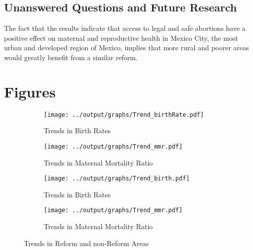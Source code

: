 \documentclass[a4paper, 11pt]{article}
\begin{document}
\begin{spacing}{1.5}
\begin{multicols}{2}
\subsection{Unanswered Questions and Future Research}      	    
The fact that the results indicate that access to legal and safe abortions have a positive effect on maternal and reproductive health in Mexico City, the most urban and developed region of Mexico, implies that more rural and poorer areas would greatly benefit from a similar reform.   
 \newpage
 
 
\end{multicols} 	
\section*{Figures}
\begin{figure}[htpb!]
	\centering
	\begin{subfigure}{.5\textwidth}
		\centering
		\texttt{[image: ../output/graphs/Trend\_birthRate.pdf]}
		\caption{Trends in Birth Rates}
		\label{birthTrend}
	\end{subfigure}%
	\begin{subfigure}{.5\textwidth}
		\centering
		\texttt{[image: ../output/graphs/Trend\_mmr.pdf]}
		\caption{Trends in Maternal Mortality Ratio}
		\label{mmrTrend}
	\end{subfigure}
	
	\begin{subfigure}{.5\textwidth}
		\centering
		\texttt{[image: ../output/graphs/Trend\_birth.pdf]}
		\caption{Trends in Birth Rates}
		\label{ }
	\end{subfigure}%
	\begin{subfigure}{.5\textwidth}
		\centering
		\texttt{[image: ../output/graphs/Trend\_mmr.pdf]}
		\caption{Trends in Maternal Mortality Ratio}
		\label{ }
	\end{subfigure}
	\caption{Trends in Reform and non-Reform Areas}
	\label{ }
\end{figure}




\end{spacing}
\end{document}

